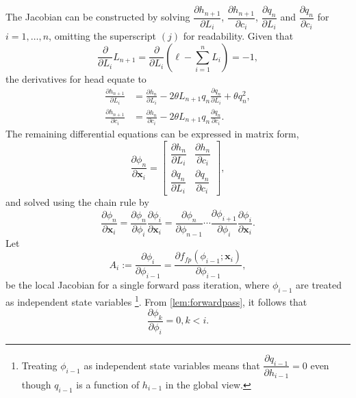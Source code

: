 The Jacobian can be constructed by solving 
$\dfrac{\partial h_{n+1}}{\partial L_i}$, 
$\dfrac{\partial h_{n+1}}{\partial c_i}$,
$\dfrac{\partial q_n}{\partial L_i}$ and
$\dfrac{\partial q_n}{\partial c_i}$
for $i = 1,\dots,n$, omitting the superscript $(j)$ for readability. Given that
\begin{equation*}
    \frac{\partial}{\partial L_i} L_{n+1} = \frac{\partial}{\partial L_i} \left(\ell-\sum_{i=1}^n L_i\right) = -1,
\end{equation*}
the derivatives for head equate to
\begin{equation}
\label{eq:dhnp1dx}
\begin{aligned}
    \frac{\partial h_{n+1}}{\partial L_i} &= \frac{\partial h_n}{\partial L_i} 
    - 2 \theta L_{n+1} q_n \frac{\partial q_{n}}{\partial L_i} 
    + \theta q_n^2, \\
    \frac{\partial h_{n+1}}{\partial c_i} &= \frac{\partial h_n}{\partial c_i}
     - 2 \theta L_{n+1} q_n \frac{\partial q_{n}}{\partial c_i}.
\end{aligned}
\end{equation}
The remaining differential equations can be expressed in matrix form,
\begin{equation*}
\frac{\partial \phi_{n}}{\partial \mathbf{x}_i} = 
    \begin{bmatrix}
        \dfrac{\partial h_n}{\partial L_i} & \dfrac{\partial h_n}{\partial c_i} \\
        \dfrac{\partial q_n}{\partial L_i} & \dfrac{\partial q_n}{\partial c_i}
    \end{bmatrix},
\end{equation*}
and solved using the chain rule by
\begin{equation*}
    \frac{\partial \phi_{n}}{\partial \mathbf{x}_i} = 
    \frac{\partial \phi_{n}}{\partial \phi_{i}} \frac{\partial \phi_i}{\partial \mathbf{x}_i} =
    \frac{\partial \phi_{n}}{\partial \phi_{n-1}} \cdots
    \frac{\partial \phi_{i+1}}{\partial \phi_{i}}
    \frac{\partial \phi_{i}}{\partial \mathbf{x}_i}.
\end{equation*}
Let
\begin{equation*}
    A_i:=\frac{\partial \phi_i}{\partial \phi_{i-1}} = \frac{\partial f_{fp}(\phi_{i-1}; \mathbf{x}_i )}{\partial \phi_{i-1}},
\end{equation*}
be the local Jacobian for a single forward pass iteration, where $\phi_{i-1}$ are treated as independent state variables 
\footnote{Treating $\phi_{i-1}$ as independent state variables means that $\dfrac{\partial q_{i-1}}{\partial h_{i-1}}=0$ even though $q_{i-1}$ is a function of $h_{i-1}$ in the global view.}. From \autoref{lem:forwardpass}, it follows that
\begin{equation*}
    \frac{\partial \phi_k}{\partial \phi_i}=0, k<i.
\end{equation*}

